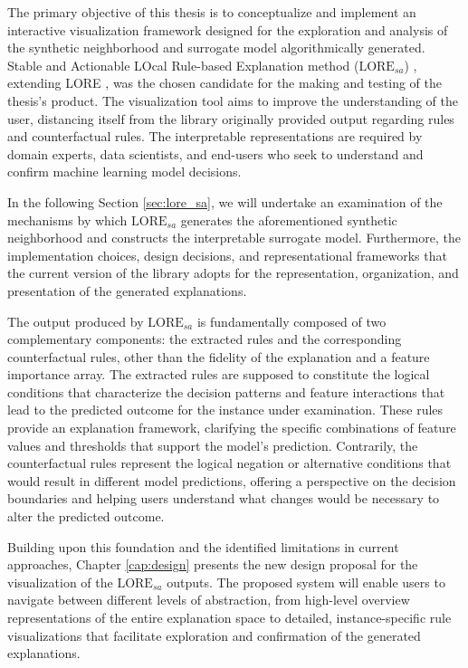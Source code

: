 The primary objective of this thesis is to conceptualize and implement an interactive visualization framework designed for the exploration and analysis of the synthetic neighborhood and surrogate model algorithmically generated.
Stable and Actionable LOcal
Rule-based Explanation method ($\text{LORE}_{sa}$) \cite{guidotti2022stable}, extending LORE \cite{guidotti2019lore}, was the chosen candidate for the making and testing of the thesis's product. The visualization tool aims to improve the understanding of the user, distancing itself from the library originally provided output regarding rules and counterfactual rules.
The interpretable representations are required by domain experts, data scientists, and end-users who seek to understand and confirm machine learning model decisions.

In the following Section \ref{sec:lore_sa}, we will undertake an examination of the mechanisms by which $\text{LORE}_{sa}$ generates the aforementioned synthetic neighborhood and constructs the interpretable surrogate model.
Furthermore, the implementation choices, design decisions, and representational frameworks that the current version of the library adopts for the representation, organization, and presentation of the generated explanations.

The output produced by $\text{LORE}_{sa}$ is fundamentally composed of two complementary components: the extracted rules and the corresponding counterfactual rules, other than the fidelity of the explanation and a feature importance array. The extracted rules are supposed to constitute the logical conditions that characterize the decision patterns and feature interactions that lead to the predicted outcome for the instance under examination. These rules provide an explanation framework, clarifying the specific combinations of feature values and thresholds that support the model's prediction. Contrarily, the counterfactual rules represent the logical negation or alternative conditions that would result in different model predictions, offering a perspective on the decision boundaries and helping users understand what changes would be necessary to alter the predicted outcome.

Building upon this foundation and the identified limitations in current approaches, Chapter \ref{cap:design} presents the new design proposal for the visualization of the $\text{LORE}_{sa}$ outputs. The proposed system will enable users to navigate between different levels of abstraction, from high-level overview representations of the entire explanation space to detailed, instance-specific rule visualizations that facilitate exploration and confirmation of the generated explanations.